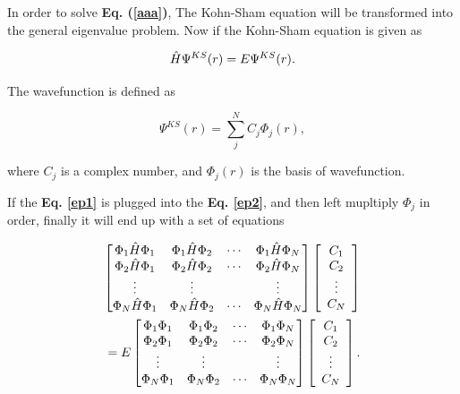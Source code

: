 \documentclass[a4paper, 12pt, titlepage,oneside,drop]{kthesis}
\begin{document}
In order to solve \textbf{Eq. (\ref{aaa})}, The Kohn-Sham equation will be transformed into the general eigenvalue problem. Now if the Kohn-Sham equation is given as

\begin{equation}\label{ep2}
 \hat{H} \Psi^{KS} (r) = E \Psi^{KS} (r).
\end{equation}
 

The wavefunction is defined as

\begin{equation}\label{ep1}
 \Psi^{KS} (r) = \sum\limits_j^N C_j \Phi_j (r),
\end{equation}
 
where $C_j$ is a complex number, and $\Phi_j (r)$ is the basis of wavefunction. 


If the \textbf{Eq. \ref{ep1}} is plugged into the \textbf{Eq. \ref{ep2}}, and then left mupltiply $\Phi_j$ in order, finally it will end up with a set of equations

\begin{equation}\begin{split}\label{ep3}
\left[
\begin{matrix}
    \Phi_1 \hat{H} \Phi_1 & \Phi_1 \hat{H} \Phi_2 & \cdots & \Phi_1 \hat{H} \Phi_N \\
    \Phi_2 \hat{H} \Phi_1 & \Phi_2 \hat{H} \Phi_2 & \cdots & \Phi_2 \hat{H} \Phi_N \\
    \vdots               & \vdots               &        & \vdots               \\
    \Phi_N \hat{H} \Phi_1 & \Phi_N \hat{H} \Phi_2 & \cdots & \Phi_N \hat{H} \Phi_N \\
\end{matrix} \right] \left[ \begin{array}{c} C_1 \\ C_2 \\ \vdots \\ C_N\end{array} \right] \\
= E \left[
\begin{matrix}
    \Phi_1 \Phi_1 & \Phi_1 \Phi_2 & \cdots & \Phi_1 \Phi_N \\
   \Phi_2 \Phi_1 & \Phi_2 \Phi_2 & \cdots & \Phi_2 \Phi_N \\
    \vdots               & \vdots               &        & \vdots               \\
   \Phi_N \Phi_1 & \Phi_N \Phi_2 & \cdots & \Phi_N \Phi_N \\
\end{matrix} \right]\left[ \begin{array}{c} C_1 \\ C_2 \\ \vdots \\ C_N\end{array} \right].
\end{split}\end{equation}
\end{document}
